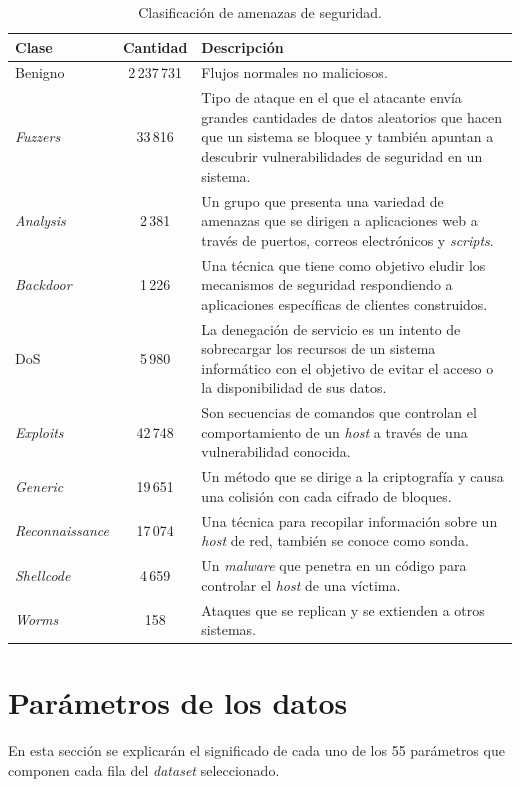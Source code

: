 \begin{table}[H]
\begin{tabular}{|l|c|>{\RaggedRight}p{8cm}|} %
\hline
\rowcolor[HTML]{C0C0C0} 
\textbf{Clase} & \textbf{Cantidad} & \textbf{Descripción} \\ \hline
Benigno & 2\,237\,731 & Flujos normales no maliciosos. \\ \hline
\textit{Fuzzers} & 33\,816 & Tipo de ataque en el que el atacante envía grandes cantidades de datos aleatorios que hacen que un sistema se bloquee y también apuntan a descubrir vulnerabilidades de seguridad en un sistema. \\ \hline
\textit{Analysis} & 2\,381 & Un grupo que presenta una variedad de amenazas que se dirigen a aplicaciones web a través de puertos, correos electrónicos y \textit{scripts}. \\ \hline
\textit{Backdoor} & 1\,226 & Una técnica que tiene como objetivo eludir los mecanismos de seguridad respondiendo a aplicaciones específicas de clientes construidos. \\ \hline
DoS & 5\,980 & La denegación de servicio es un intento de sobrecargar los recursos de un sistema informático con el objetivo de evitar el acceso o la disponibilidad de sus datos. \\ \hline
\textit{Exploits} & 42\,748 & Son secuencias de comandos que controlan el comportamiento de un \textit{host} a través de una vulnerabilidad conocida. \\ \hline
\textit{Generic} & 19\,651 & Un método que se dirige a la criptografía y causa una colisión con cada cifrado de bloques. \\ \hline
\textit{Reconnaissance} & 17\,074 & Una técnica para recopilar información sobre un \textit{host} de red, también se conoce como sonda. \\ \hline
\textit{Shellcode} & 4\,659 & Un \textit{malware} que penetra en un código para controlar el \textit{host} de una víctima. \\ \hline
\textit{Worms} & 158 & Ataques que se replican y se extienden a otros sistemas. \\ \hline
\end{tabular}
\centering
\caption{Clasificación de amenazas de seguridad.} 
\label{tab:attacks-tab}
\end{table}

\section{Parámetros de los datos} \label{sec.param-datos}
En esta sección se explicarán el significado de cada uno de los 55 parámetros que componen cada fila del \textit{dataset} seleccionado.

